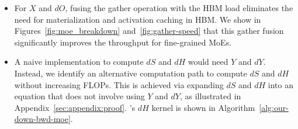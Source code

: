 

\begin{itemize}[nosep]
    \item For $X$ and $dO$, fusing the gather operation with the HBM load eliminates the need for materialization and activation caching in HBM. We show in Figures~\ref{fig:moe_breakdown} and~\ref{fig:gather-speed} that this gather fusion significantly improves the throughput for fine-grained MoEs.

    \item A naive implementation to compute $dS$ and $dH$ would need $Y$ and $dY$. Instead, we identify an alternative computation path to compute $dS$ and $dH$ without increasing FLOPs. This is achieved via expanding $dS$ and $dH$ into an equation that does not involve using $Y$ and $dY$, as illustrated in Appendix~\ref{sec:appendix:proof}. \Algname's $dH$ kernel is shown in Algorithm~\ref{alg:our-down-bwd-moe}.
\end{itemize}











